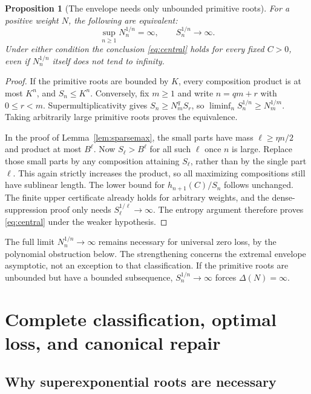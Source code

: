 \documentclass[11pt,a4paper]{article}
\numberwithin{equation}{section}
\newtheorem{proposition}[theorem]{Proposition}
\theoremstyle{definition}
\theoremstyle{remark}
\begin{document}
\begin{proposition}[The envelope needs only unbounded primitive roots]
\label{prop:unboundedroots}
For a positive weight $N$, the following are equivalent:
\[
 \sup_{n\ge1}N_n^{1/n}=\infty,
 \qquad S_n^{1/n}\longrightarrow\infty.
\]
Under either condition the conclusion \eqref{eq:central} holds for every
fixed $C>0$, even if $N_n^{1/n}$ itself does not tend to infinity.
\end{proposition}
\begin{proof}
If the primitive roots are bounded by $K$, every composition product is
at most $K^n$, and $S_n\le K^n$. Conversely, fix $m\ge1$ and write
$n=qm+r$ with $0\le r<m$. Supermultiplicativity gives
$S_n\ge N_m^qS_r$, so
$\liminf_n S_n^{1/n}\ge N_m^{1/m}$. Taking arbitrarily large primitive
roots proves the equivalence.

In the proof of Lemma~\ref{lem:sparsemax}, the small parts have mass
$\ell\ge\eta n/2$ and product at most $B^\ell$. Now
$S_\ell>B^\ell$ for all such $\ell$ once $n$ is large. Replace those
small parts by any composition attaining $S_\ell$, rather than by the
single part $\ell$. This again strictly increases the product, so all
maximizing compositions still have sublinear length. The lower bound
for $h_{n+1}(C)/S_n$ follows unchanged. The finite upper certificate
already holds for arbitrary weights, and the dense-suppression proof
only needs $S_\ell^{1/\ell}\to\infty$. The entropy argument therefore
proves \eqref{eq:central} under the weaker hypothesis.
\end{proof}

The full limit $N_n^{1/n}\to\infty$ remains necessary for universal
zero loss, by the polynomial obstruction below. The strengthening
concerns the extremal envelope asymptotic, not an exception to that
classification. If the primitive roots are unbounded but have a bounded
subsequence, $S_n^{1/n}\to\infty$ forces $\Delta(N)=\infty$.

\section{Complete classification, optimal loss, and canonical repair}
\label{sec:classification}

\subsection{Why superexponential roots are necessary}
\end{document}
